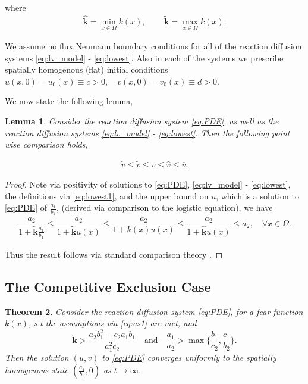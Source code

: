 \documentclass[10pt]{amsart}
\newtheorem{theorem}{Theorem}[section]
\newtheorem{lemma}[theorem]{Lemma}
\theoremstyle{definition}
\begin{document}
where
\begin{align}\label{eq:lowest1}
 \mathbf{\widehat{k}} = \min_{x\in \Omega} k(x), \quad \, \quad   \mathbf{\widetilde{k} }= \max_{x\in \Omega} k(x).
\end{align}

We assume no flux Neumann boundary conditions for all of the reaction diffusion systems \eqref{eq:lv_model} - \eqref{eq:lowest}. Also in each of the systems we prescribe spatially homogenous (flat) initial conditions
$u(x,0)=u_0 (x) \equiv c > 0, \quad v(x,0)=v_0(x) \equiv d > 0.$

We now state the following lemma,

\begin{lemma}
\label{lem:com1}
Consider the reaction diffusion system \eqref{eq:PDE}, as well as the reaction diffusion systems \eqref{eq:lv_model} - \eqref{eq:lowest}. Then the following point wise comparison holds,

\begin{align*}
	 \tilde{v} \leq	\widetilde{v}	 \leq   v  \leq     \widehat{v}	          \leq \overline{v}.
	\end{align*}

\end{lemma}


\begin{proof}

Note via positivity of solutions to \eqref{eq:PDE}, \eqref{eq:lv_model} - \eqref{eq:lowest}, the definitions via  \eqref{eq:lowest1}, and the upper bound on $u$, which is a solution to \eqref{eq:PDE} of $\frac{a_{1}}{b_{1}}$, (derived via comparison to the logistic equation), we have
\begin{align}\label{eq:com1}
	\dfrac{a_{2}}{1 +  \mathbf{\widetilde{k}}  \frac{a_{1}}{b_{1}}}  \le    
	 \dfrac{a_{2}}{1 +  \mathbf{\widetilde{k}}  u(x)} \le 
	 \dfrac{a_{2}}{1 + k(x) u(x)} \le 
	 \dfrac{a_{2}}{1 +  \mathbf{\widehat{k}}u(x)} \le 
	 a_{2}, 
	 \quad \forall x\in \Omega.
\end{align}
	
Thus the result follows via standard comparison theory \cite{Gil77}.
\end{proof}




\subsection{The Competitive Exclusion Case}

\begin{theorem}\label{thm:ce_1_pde}
	Consider the reaction diffusion system \eqref{eq:PDE}, for a fear function $k(x)$, s.t the assumptions via \eqref{eq:as1} are met, and
	\[ \mathbf{\widetilde{k} }>\dfrac{a_2 b_1^2-c_2a_1b_1}{a_1^2c_2} \quad \text{and} \quad \dfrac{a_1}{a_2} > \max \Big\{ \dfrac{b_1}{c_2},\dfrac{c_1}{b_2}  \Big\}. \]
	Then the solution $(u,v)$ to \eqref{eq:PDE} converges uniformly to the spatially homogenous state $(\frac{a_{1}}{b_{1}},0)$ as $t \to \infty$.
\end{theorem}
\end{document}
